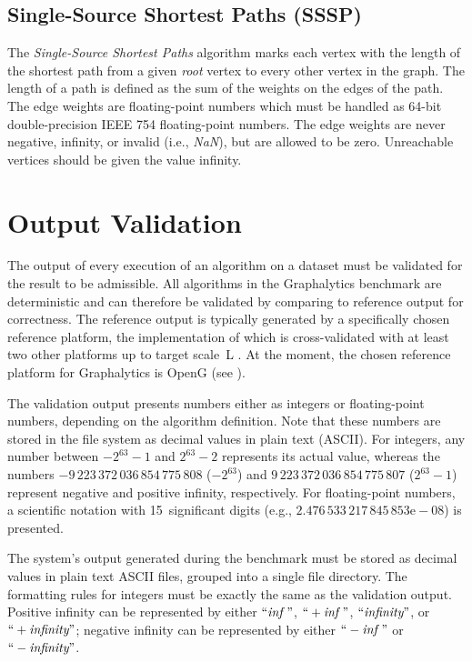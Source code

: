 \subsection{Single-Source Shortest Paths (SSSP)}
The \emph{Single-Source Shortest Paths} algorithm marks each vertex with the length of the shortest path from a given \emph{root} vertex to every other vertex in the graph. The length of a path is defined as the sum of the weights on the edges of the path. The edge weights are floating-point numbers which must be handled as 64-bit double-precision IEEE 754 floating-point numbers. The edge weights are never negative, infinity, or invalid (i.e., \emph{NaN}), but are allowed to be zero. Unreachable vertices should be given the value infinity.






\section{Output Validation}
\label{sec:definitions_validation}

The output of every execution of an algorithm on a dataset must be validated for the result to be admissible. All algorithms in the Graphalytics benchmark are deterministic and can therefore be validated by comparing to reference output for correctness. The reference output is typically generated by a specifically chosen reference platform, the implementation of which is cross-validated with at least two other platforms up to target scale~L . At the moment, the chosen reference platform for Graphalytics is OpenG (see ).

The validation output presents numbers either as integers or floating-point numbers, depending on the algorithm definition. Note that these numbers are stored in the file system as decimal values in plain text (ASCII). For integers, any number between $-2^{63}-1$ and $2^{63}-2$ represents its actual value, whereas the numbers ${-9\,223\,372\,036\,854\,775\,808}$ ($-2^{63}$) and $9\,223\,372\,036\,854\,775\,807$ ($2^{63}-1$) represent negative and positive infinity, respectively.
For floating-point numbers, a scientific notation with 15~significant digits (e.g., $2.476\,533\,217\,845\,853\mathrm{e-}08$) is presented.

The system's output generated during the benchmark must be stored as decimal values in plain text ASCII files, grouped into a single file directory. The formatting rules for integers must be exactly the same as the validation output. Positive infinity can be represented by either $``\textit{inf}\ "$, $``+\textit{inf}\ "$, $``\textit{infinity}"$, or $``+\textit{infinity}"$; negative infinity can be represented by either $``-\textit{inf}\ "$ or $``-\textit{infinity}"$. 

